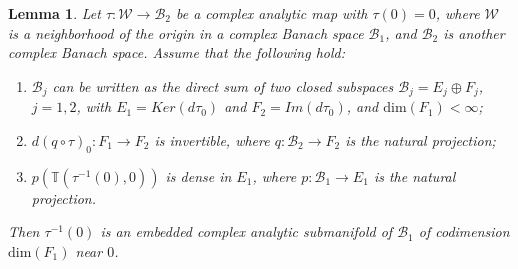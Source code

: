 \documentclass{amsart}
\numberwithin{equation}{section}
\newtheorem{lemma}[theorem]{Lemma}%
\theoremstyle{definition}
\theoremstyle{remark}
\begin{document}
 
\begin{lemma}\label{lem:holomorphiczero} Let $\tau:\mathcal{W}\to \mathcal{B}_2$ be a complex analytic map with $\tau(0)=0$, where $\mathcal{W}$ is a neighborhood of the origin in a complex Banach space $\mathcal{B}_1$, and $\mathcal{B}_2$ is another complex Banach space. Assume that the following hold:
\begin{enumerate}
\item $\mathcal{B}_j$ can be written as the direct sum of two closed subspaces $\mathcal{B}_j=E_j\oplus F_j$, $j=1,2$, with $E_1=Ker(d\tau_0)$ and $F_2= Im(d\tau_0)$, and $\text{dim}(F_1)<\infty$;
\item $d(q\circ\tau)_0: F_1\to F_2$ is invertible, where $q: \mathcal{B}_2\to F_2$ is the natural projection;
\item $p(\mathbb{T}(\tau^{-1}(0),0))$ is dense in $E_1$, where $p:\mathcal{B}_1\to E_1$ is the natural projection.
\end{enumerate}
Then $\tau^{-1}(0)$ is an embedded complex analytic submanifold of $\mathcal{B}_1$ of codimension $\text{dim}(F_1)$ near $0$. 
\end{lemma}
\end{document}
